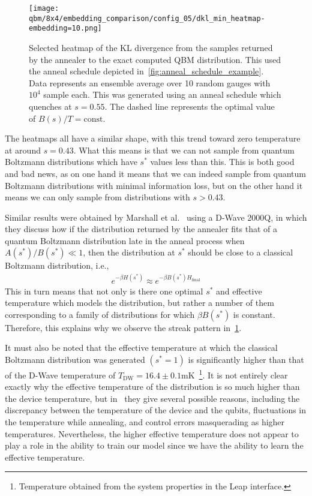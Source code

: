 \begin{figure}[!htb]
    \begin{center}
        \texttt{[image: qbm/8x4/embedding\_comparison/config\_05/dkl\_min\_heatmap-embedding=10.png]}
    \end{center}
    \caption{Selected heatmap of the KL divergence from the samples returned by the annealer to the exact computed QBM distribution. This used the anneal schedule depicted in~\cref{fig:anneal_schedule_example}. Data represents an ensemble average over 10 random gauges with \( 10^4 \) sample each. This was generated using an anneal schedule which quenches at \( s = 0.55 \). The dashed line represents the optimal value of \( B(s) / T = \text{const.} \)}
    \label{fig:dkl_min_heatmap}
\end{figure}

The heatmaps all have a similar shape, with this trend toward zero temperature at around \( s = 0.43 \).
What this means is that we can not sample from quantum Boltzmann distributions which have \( s^* \) values less than this.
This is both good and bad news, as on one hand it means that we can indeed sample from quantum Boltzmann distributions with minimal information loss, but on the other hand it means we can only sample from distributions with \( s > 0.43 \).

Similar results were obtained by Marshall et al.~\cite{marshall_2019} using a D-Wave 2000Q, in which they discuss how if the distribution returned by the annealer fits that of a quantum Boltzmann distribution late in the anneal process when \( A(s^*) / B(s^*) \ll 1 \), then the distribution at \( s^* \) should be close to a classical Boltzmann distribution, i.e.,
\begin{align}
    e^{-\beta H(s^*)} \approx e^{-\beta B(s^*) H_\text{final}}
\end{align}
This in turn means that not only is there one optimal \( s^* \) and effective temperature which models the distribution, but rather a number of them corresponding to a family of distributions for which \( \beta B(s^*) \) is constant.
Therefore, this explains why we observe the streak pattern in~\cref{fig:dkl_min_heatmap}.

It must also be noted that the effective temperature at which the classical Boltzmann distribution was generated \( (s^* = 1) \) is significantly higher than that of the D-Wave temperature of \( T_\text{DW} = 16.4 \pm 0.1 \si{\milli\kelvin} \)~\cite{dwave_leap}\footnote{Temperature obtained from the system properties in the Leap interface.}.
It is not entirely clear exactly why the effective temperature of the distribution is so much higher than the device temperature, but in~\cite{marshall_2019} they give several possible reasons, including the discrepancy between the temperature of the device and the qubits, fluctuations in the temperature while annealing, and control errors masquerading as higher temperatures.
Nevertheless, the higher effective temperature does not appear to play a role in the ability to train our model since we have the ability to learn the effective temperature.

